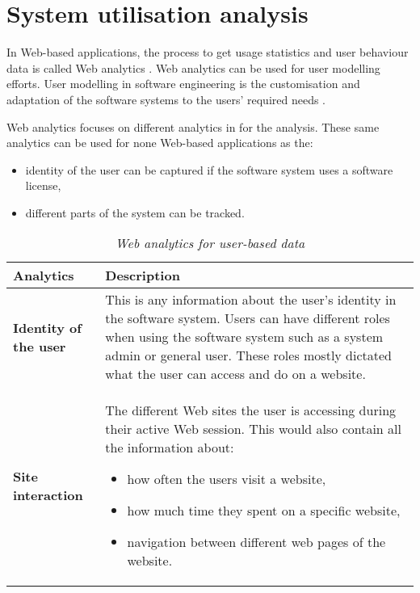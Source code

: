 \clearpage

\section{System utilisation analysis}\label{sec:ch1_systemUtilisation}
In Web-based applications, the process to get usage statistics and user behaviour data is called Web analytics \cite{Kocsis2012}. Web analytics can be used for user modelling efforts. User modelling in software engineering is the customisation and adaptation of the software systems to the users' required needs \cite{Waqar2017, Paliouras1999}. \par Web analytics focuses on different analytics in  for the analysis. These same analytics can be used for none Web-based applications as the: 

\begin{itemize}
	\item identity of the user can be captured if the software system uses a software license,
	\item different parts of the system can be tracked.
\end{itemize} 

\begin{table}[!htb]
	\centering
	\caption[Web analytics for user-based data]
	{\textit{Web analytics for user-based data}}
	\label{tbl:ch1_webAnalytics}
	\begin{tabularx}{\textwidth}{|l|X|}
		\hline \textbf{Analytics}  & \textbf{Description} \\
		\hline \textbf{Identity of the user} & This is any information about the user's identity in the software system. Users can have different roles when using the software system such as a system admin or general user. These roles mostly dictated what the user can access and do on a website. \\
		\hline \textbf{Site interaction} & The different Web sites the user is accessing during their active Web session. This would also contain all the information about: 
		\begin{itemize}
			\item how often the users visit a website,
			\item how much time they spent on a specific website,
			\item navigation between different web pages of the website.
		\end{itemize}
		\\
		\hline
	\end{tabularx}
\end{table}

